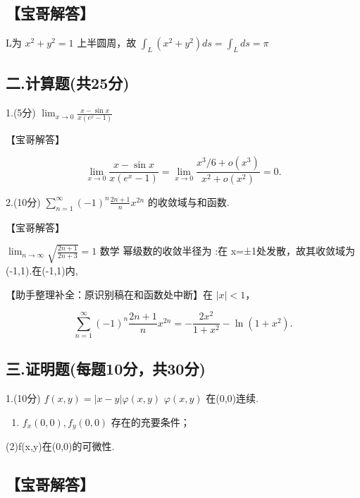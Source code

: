 \documentclass[11pt,fontset=fandol]{ctexart}
\providecommand{\tightlist}{\setlength{\itemsep}{0pt}\setlength{\parskip}{0pt}}
\begin{document}
\subsection{【宝哥解答】}\label{ux5b9dux54e5ux89e3ux7b54-3}

L为 \(x ^ { 2 } + y ^ { 2 } = 1\) 上半圆周，故
\(\int _ { L } ( x ^ { 2 } + y ^ { 2 } ) d s = \int _ { L } d s = \pi\)

\subsection{二.计算题(共25分)}\label{ux4e8c.ux8ba1ux7b97ux9898ux517125ux5206}

1.(5分)
\(\lim _ { x \to 0 } { \frac { x - \sin { x } } { x ( e ^ { x } - 1 ) } }\)

【宝哥解答】

\[
\lim_{x\to0}\frac{x-\sin x}{x(e^x-1)}
=\lim_{x\to0}\frac{x^3/6+o(x^3)}{x^2+o(x^2)}=0.
\]

2.(10分)
\(\sum _ { n = 1 } ^ { \infty } ( - 1 ) ^ { n } { \frac { 2 n + 1 } { n } } x ^ { 2 n }\)
的收敛域与和函数.

【宝哥解答】

\(\lim _ { n \to \infty } \sqrt { \frac { 2 n + 1 } { 2 n + 3 } } = 1\)
数学 幂级数的收敛半径为 :在 x=±1处发散，故其收敛域为(-1,1).在(-1,1)内,

【助手整理补全：原识别稿在和函数处中断】在 \(|x|<1\)，

\[
\sum_{n=1}^{\infty}(-1)^n\frac{2n+1}{n}x^{2n}
=-\frac{2x^2}{1+x^2}-\ln(1+x^2).
\]

\subsection{三.证明题(每题10分，共30分)}\label{ux4e09.ux8bc1ux660eux9898ux6bcfux989810ux5206ux517130ux5206}

1.(10分) \(f ( x , y ) = \left| x - y \right| \varphi ( x , y )\)
\(\varphi ( x , y )\) 在(0,0)连续.

\begin{enumerate}
\def\labelenumi{(\arabic{enumi})}
\tightlist
\item
  \(f _ { x } ( 0 , 0 ) , f _ { y } ( 0 , 0 )\) 存在的充要条件；
\end{enumerate}

(2)f(x,y)在(0,0)的可微性.

\subsection{【宝哥解答】}\label{ux5b9dux54e5ux89e3ux7b54-4}
\end{document}
